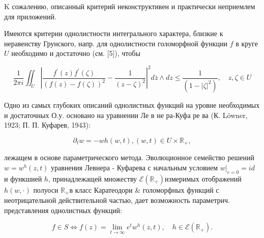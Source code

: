 \documentclass[10pt]{article}
\begin{document}
K сожалению, описанный критерий неконструктивен и практически неприемлем для приложений.



Имеются критерии однолистности интегрального характера, близкие к неравенству Грунского, напр. для однолистности голоморфной функции $f$ в круге $U$ необходимо и достаточно (см. [5]), чтобы



\[

\frac{1}{2 \pi i} \iint_{U}\left|\frac{f^{\prime}(z) f^{\prime}(\zeta)}{(f(z)-f(\zeta))^{2}}-\frac{1}{(z-\zeta)^{2}}\right|^{2} d \bar{z} \wedge d z \leqslant \frac{1}{\left(1-|\zeta|^{2}\right)}, \quad z, \zeta \in U

\]



Одно из самых глубоких описаний однолистных функций на уровне необходимых и достаточных О.у. основано на уравнении Ле в не ра-Куфа ре ва (К. Löwner, 1923; П. П. Куфарев, 1943):



\[

\partial_{t} w=-w h(w, t),(w, t) \in U \times \mathbb{R}_{+},

\]



лежащем в основе параметрического метода. Эволюционное семейство решений $w=w^{h}(z, t)$ уравнения Левнера - Куфарева с начальным условием $\left.w\right|_{e=0}=i d$ и функшией $h$, принадлежащей множеству $\mathscr{E}\left(\mathbb{R}_{+}\right)$измеримых отображений $h(w, \cdot)$ полуоси $\mathbb{R}_{+}$в класс Каратеодори \& голоморфных функций с неотрицательной действительной частью, дает возможность параметрич. представления однолистных функций:



\[

f \in S \Leftrightarrow f(z)=\lim _{t \rightarrow \infty} e^{t} w^{h}(z, t), \quad h \in \mathscr{E}\left(\mathbb{R}_{+}\right) .

\]
\end{document}
